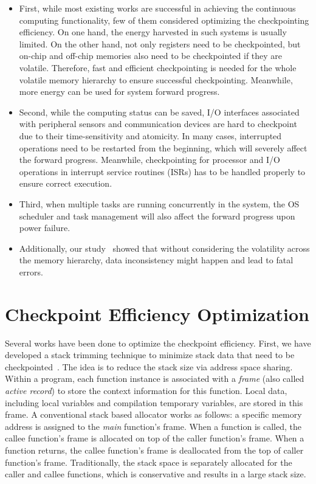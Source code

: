 \begin{itemize}[noitemsep,topsep=0pt,parsep=0pt,partopsep=0pt]
\item First, while most existing works are successful in achieving the continuous computing functionality, few of them considered optimizing the checkpointing efficiency. On one hand, the energy harvested in such systems is usually limited. On the other hand, not only registers need to be checkpointed, but on-chip and off-chip memories also need to be checkpointed if they are volatile. Therefore, fast and efficient checkpointing is needed for the whole volatile memory hierarchy to ensure successful checkpointing. Meanwhile, more energy can be used for system forward progress.
\item Second, while the computing status can be saved, I/O interfaces associated with peripheral sensors and communication devices are hard to checkpoint due to their time-sensitivity and atomicity. In many cases, interrupted operations need to be restarted from the beginning, which will severely affect the forward progress. Meanwhile, checkpointing for processor and I/O operations in interrupt service routines (ISRs) has to be handled properly to ensure correct execution.
\item Third, when multiple tasks are running concurrently in the system, the OS scheduler and task management will also affect the forward progress upon power failure. 
\item  Additionally, our study~\cite{DBLP:conf/dac/XieZPHLX15} showed that without considering the volatility across the memory hierarchy, data inconsistency might happen and lead to fatal errors. 
\end{itemize}

\section{Checkpoint Efficiency Optimization}
Several works have been done to optimize the checkpoint efficiency. First, we have developed a stack trimming technique to minimize stack data that need to be checkpointed~\cite{Li:2015:CDA:2744769.2744809}. The idea is to reduce the stack size via address space sharing. Within a program, each function instance is associated with a \textit{frame} (also called \textit{active record}) to store the context information for this function. Local data, including local variables and compilation temporary variables, are stored in this frame. A conventional stack based allocator works as follows: a specific memory address is assigned to the \textit{main} function's frame. When a function is called, the callee function's frame is allocated on top of the caller function's frame. When a function returns, the callee function's frame is deallocated from the top of caller function's frame.
Traditionally, the stack space is separately allocated for the caller and callee functions, which is conservative and results in a large stack size. 


